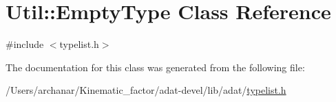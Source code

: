 \hypertarget{classUtil_1_1EmptyType}{}\section{Util\+:\+:Empty\+Type Class Reference}
\label{classUtil_1_1EmptyType}


{\ttfamily \#include $<$typelist.\+h$>$}



The documentation for this class was generated from the following file\+:\begin{DoxyCompactItemize}
\item 
/\+Users/archanar/\+Kinematic\+\_\+factor/adat-\/devel/lib/adat/\mbox{\hyperlink{adat-devel_2lib_2adat_2typelist_8h}{typelist.\+h}}\end{DoxyCompactItemize}
